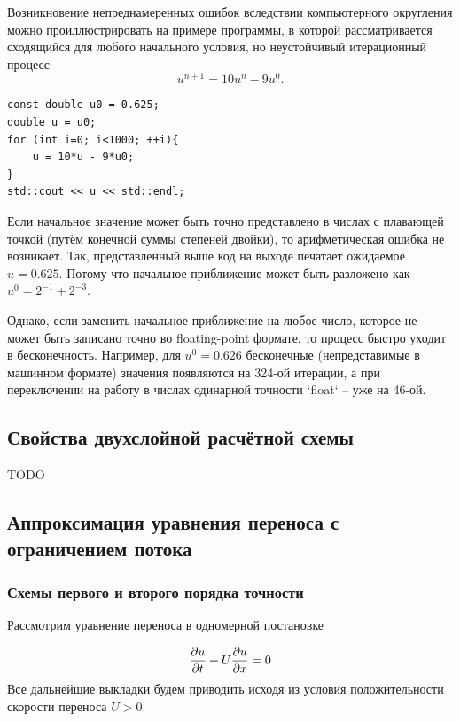 Возникновение непреднамеренных ошибок вследствии компьютерного округления можно проиллюстрировать на примере
программы, в которой рассматривается сходящийся для любого начального условия, но неустойчивый итерационный процесс
\begin{equation*}
    u^{n+1} = 10 u^{n} - 9 u^{0}.
\end{equation*}

\begin{verbatim}
const double u0 = 0.625;
double u = u0;
for (int i=0; i<1000; ++i){
    u = 10*u - 9*u0;
}
std::cout << u << std::endl;
\end{verbatim}

Если начальное значение может быть точно представлено в
числах с плавающей точкой (путём конечной суммы степеней двойки),
то арифметическая ошибка не возникает.
Так, представленный выше код на выходе печатает ожидаемое $u=0.625$.
Потому что начальное приближение может быть разложено как $u^0 = 2^{-1} + 2^{-3}$.

Однако, если заменить начальное приближение на любое число,
которое не может быть записано точно во floating-point формате,
то процесс быстро уходит в бесконечность.
Например, для $u^0 = 0.626$ бесконечные (непредставимые в машинном формате) значения
появляются на 324-ой итерации,
а при переключении на работу в числах одинарной точности `float` -- уже на 46-ой.

\subsection{Свойства двухслойной расчётной схемы}
TODO

\subsection{Аппроксимация уравнения переноса с ограничением потока}

\subsubsection{Схемы первого и второго порядка точности}
Рассмотрим уравнение переноса в одномерной постановке

\begin{equation*}
\label{eq:tvd_transport}
\frac{\partial u}{\partial t} + U\frac{\partial u}{\partial x} = 0
\end{equation*}
Все дальнейшие выкладки будем приводить исходя из условия положительности скорости переноса $U > 0$.

